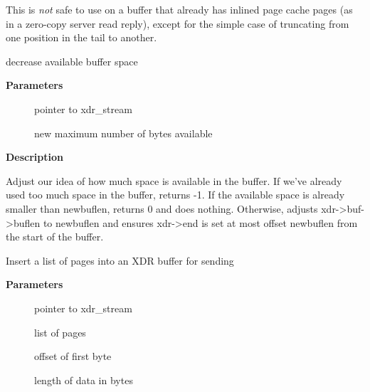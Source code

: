 \documentclass[a4paper,8pt,english]{sphinxmanual}
\begin{document}
This is \emph{not} safe to use on a buffer that already has inlined page
cache pages (as in a zero-copy server read reply), except for the
simple case of truncating from one position in the tail to another.

\begin{fulllineitems}
\label{networking/kapi:c.xdr_restrict_buflen}
decrease available buffer space

\end{fulllineitems}


\textbf{Parameters}
\begin{description}
\item[{}] \leavevmode
pointer to xdr\_stream

\item[{}] \leavevmode
new maximum number of bytes available

\end{description}

\textbf{Description}

Adjust our idea of how much space is available in the buffer.
If we've already used too much space in the buffer, returns -1.
If the available space is already smaller than newbuflen, returns 0
and does nothing.  Otherwise, adjusts xdr-\textgreater{}buf-\textgreater{}buflen to newbuflen
and ensures xdr-\textgreater{}end is set at most offset newbuflen from the start
of the buffer.

\begin{fulllineitems}
\label{networking/kapi:c.xdr_write_pages}
Insert a list of pages into an XDR buffer for sending

\end{fulllineitems}


\textbf{Parameters}
\begin{description}
\item[{}] \leavevmode
pointer to xdr\_stream

\item[{}] \leavevmode
list of pages

\item[{}] \leavevmode
offset of first byte

\item[{}] \leavevmode
length of data in bytes

\end{description}
\end{document}
